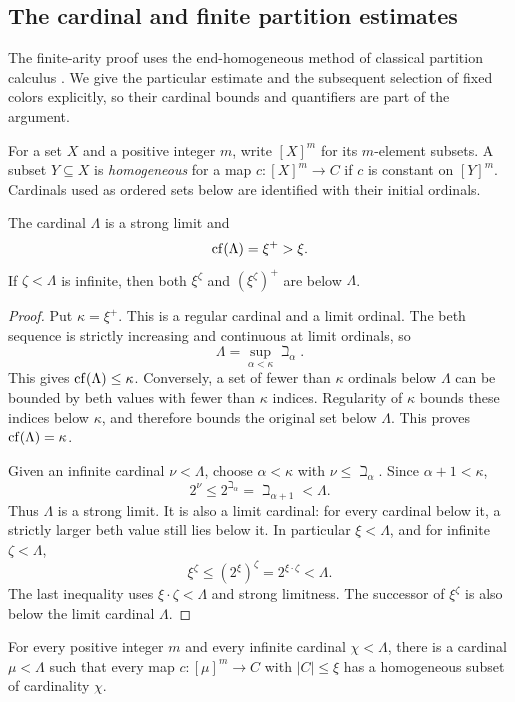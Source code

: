 \subsection{The cardinal and finite partition estimates}

The finite-arity proof uses the end-homogeneous method of classical
partition calculus \cite{ErdosRado1956}. We give the particular estimate
and the subsequent selection of fixed colors explicitly, so their
cardinal bounds and quantifiers are part of the argument.

For a set $X$ and a positive integer $m$, write $[X]^m$ for its
$m$-element subsets. A subset $Y\subseteq X$ is \emph{homogeneous} for
a map $c:[X]^m\to C$ if $c$ is constant on $[Y]^m$.
Cardinals used as ordered sets below are identified with their initial
ordinals.

\begin{lemma}\label{cat:cardinals}
The cardinal $\Lambda$ is a strong limit and
\[
 \operatorname{cf}(\Lambda)=\xi^+>\xi.
\]
If $\zeta<\Lambda$ is infinite, then both $\xi^\zeta$ and
$(\xi^\zeta)^+$ are below $\Lambda$.
\end{lemma}

\begin{proof}
Put $\kappa=\xi^+$. This is a regular cardinal and a limit ordinal.
The beth sequence is strictly increasing and continuous at limit
ordinals, so
\[
 \Lambda=\sup_{\alpha<\kappa}\beth_\alpha.
\]
This gives $\operatorname{cf}(\Lambda)\le\kappa$. Conversely, a set of fewer than
$\kappa$ ordinals below $\Lambda$ can be bounded by beth values with
fewer than $\kappa$ indices. Regularity of $\kappa$ bounds these indices
below $\kappa$, and therefore bounds the original set below $\Lambda$.
This proves $\operatorname{cf}(\Lambda)=\kappa$.

Given an infinite cardinal $\nu<\Lambda$, choose $\alpha<\kappa$ with
$\nu\le\beth_\alpha$. Since $\alpha+1<\kappa$,
\[
 2^\nu\le 2^{\beth_\alpha}=\beth_{\alpha+1}<\Lambda.
\]
Thus $\Lambda$ is a strong limit. It is also a limit cardinal: for
every cardinal below it, a strictly larger beth value still lies below
it. In particular $\xi<\Lambda$, and for infinite $\zeta<\Lambda$,
\[
 \xi^\zeta\le (2^\xi)^\zeta
       =2^{\xi\cdot\zeta}<\Lambda.
\]
The last inequality uses $\xi\cdot\zeta<\Lambda$ and strong
limitness. The successor of $\xi^\zeta$ is also below the limit
cardinal $\Lambda$.
\end{proof}

\begin{lemma}\label{cat:finite-partition}
For every positive integer $m$ and every infinite cardinal
$\chi<\Lambda$, there is a cardinal $\mu<\Lambda$ such that every
map $c:[\mu]^m\to C$ with $|C|\le\xi$ has a homogeneous subset of
cardinality $\chi$.
\end{lemma}

